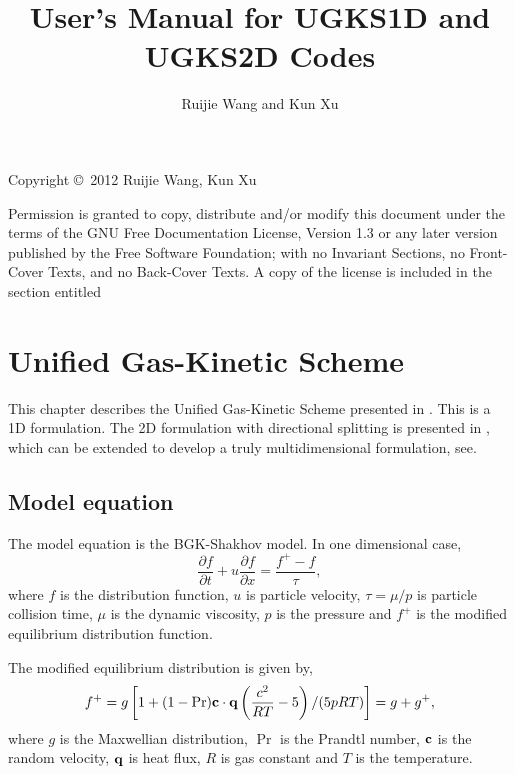 \documentclass[a4paper]{book}
\begin{document}
\title{User's Manual for UGKS1D and UGKS2D Codes}
\author{Ruijie Wang and Kun Xu}
\maketitle

\thispagestyle{empty}
Copyright \copyright\ 2012 Ruijie Wang, Kun Xu

Permission is granted to copy, distribute and/or modify this document
under the terms of the GNU Free Documentation License, Version 1.3 or
any later version published by the Free Software Foundation; with no
Invariant Sections, no Front-Cover Texts, and no Back-Cover Texts.  A
copy of the license is included in the section entitled 

\frontmatter
\tableofcontents

\mainmatter

\chapter{Unified Gas-Kinetic Scheme}
This chapter describes the Unified Gas-Kinetic Scheme presented in \cite{Xu2010,Xu2011}. This is a 1D formulation. The 2D formulation with directional splitting is presented in \cite{Huang2012}, which can be extended to develop a truly multidimensional formulation, see\cite{Xu2005}.

\section{Model equation}
The model equation is the BGK-Shakhov model. In one dimensional case,
\begin{equation}
    \label{eq:bgk-shakhov}
    \frac{\partial f}{\partial t}+u\frac{\partial f}{\partial x}=\frac{f^+-f}{\tau},
\end{equation}
where $f$ is the distribution function, $u$ is particle velocity, $\tau=\mu/p$ is particle collision time, $\mu$ is the dynamic viscosity, $p$ is the pressure and $f^+$ is the modified equilibrium distribution function.

The modified equilibrium distribution is given by,
\begin{equation}
    f^+ = g\left[1+(1-\Pr){\bf c}\cdot{\bf q}\left(\frac{c^2}{RT}-5\right)/(5pRT)\right]=g+g^+,
\end{equation}
where $g$ is the Maxwellian distribution, $\Pr$ is the Prandtl number, ${\bf c}$ is the random velocity, ${\bf q}$ is heat flux, $R$ is gas constant and $T$ is the temperature.
\end{document}

